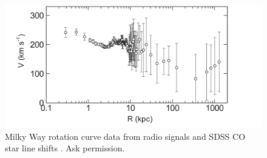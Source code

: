 \documentclass[reprint,%
 amsmath,amssymb,
 aps,
]{revtex4-1}
\begin{document}
 \begin{figure}
    \centering
    \includegraphics[width=\linewidth]{Sofue_MWtoLGData}
    \caption{ Milky Way rotation curve data from radio signals and SDSS CO star line shifts  \cite{Sof11}. Ask permission.}
    \label{fig:mwSofue}
\end{figure}



  
  
\end{document}

